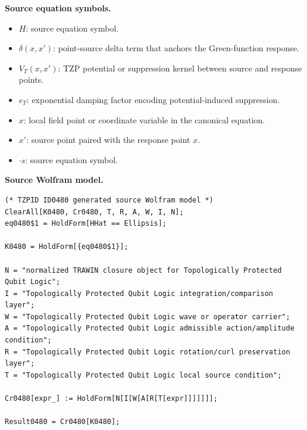 \begin{minipage}[t]{0.49\linewidth}
\begingroup
\small
\raggedright
\textbf{Source equation symbols.}\par
\begin{itemize}[leftmargin=1.35em,itemsep=1pt,topsep=1pt,parsep=0pt]
    \item $H$: source equation symbol.
    \item $\delta(x,x')$: point-source delta term that anchors the Green-function response.
    \item $V_{T}(x,x')$: TZP potential or suppression kernel between source and response points.
    \item $e_T$: exponential damping factor encoding potential-induced suppression.
    \item $x$: local field point or coordinate variable in the canonical equation.
    \item $x'$: source point paired with the response point $x$.
    \item $\cdot s$: source equation symbol.
\end{itemize}
\endgroup
\end{minipage}\hfill
\begin{minipage}[t]{0.47\linewidth}
\begingroup
\scriptsize
\raggedright
\textbf{Source Wolfram model.}\par
\begin{Verbatim}[fontsize=\tiny,breaklines=true,breakanywhere=true]
(* TZPID ID0480 generated source Wolfram model *)
ClearAll[K0480, Cr0480, T, R, A, W, I, N];
eq0480$1 = HoldForm[HHat == Ellipsis];

K0480 = HoldForm[{eq0480$1}];

N = "normalized TRAWIN closure object for Topologically Protected Qubit Logic";
I = "Topologically Protected Qubit Logic integration/comparison layer";
W = "Topologically Protected Qubit Logic wave or operator carrier";
A = "Topologically Protected Qubit Logic admissible action/amplitude condition";
R = "Topologically Protected Qubit Logic rotation/curl preservation layer";
T = "Topologically Protected Qubit Logic local source condition";

Cr0480[expr_] := HoldForm[N[I[W[A[R[T[expr]]]]]]];

Result0480 = Cr0480[K0480];
\end{Verbatim}
\endgroup
\end{minipage}

